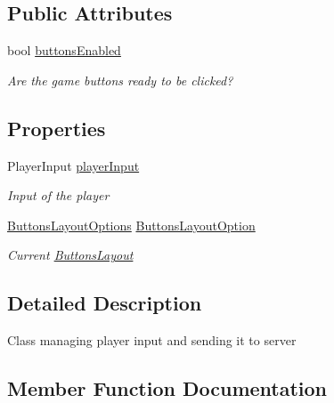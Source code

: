 \subsection*{Public Attributes}
\begin{DoxyCompactItemize}
\item 
bool \mbox{\hyperlink{class_game_pad_1_1_player_ac313e382120a9a078b14699582519e21}{buttons\+Enabled}}
\begin{DoxyCompactList}\small\item\em Are the game buttons ready to be clicked? \end{DoxyCompactList}\end{DoxyCompactItemize}
\subsection*{Properties}
\begin{DoxyCompactItemize}
\item 
Player\+Input \mbox{\hyperlink{class_game_pad_1_1_player_a1a82f9fc7b2d4e62379383f26173b51e}{player\+Input}}
\begin{DoxyCompactList}\small\item\em Input of the player \end{DoxyCompactList}\item 
\mbox{\hyperlink{namespace_game_pad_ad65f651e47321df25402246e8df26c37}{Buttons\+Layout\+Options}} \mbox{\hyperlink{class_game_pad_1_1_player_ac192b98678d2dee17a969ee788d7a1a3}{Buttons\+Layout\+Option}}
\begin{DoxyCompactList}\small\item\em Current \mbox{\hyperlink{class_game_pad_1_1_buttons_layout}{Buttons\+Layout}} \end{DoxyCompactList}\end{DoxyCompactItemize}


\subsection{Detailed Description}
Class managing player input and sending it to server 



\subsection{Member Function Documentation}
\mbox{\label{class_game_pad_1_1_player_ab9a2029ba8cc16a59a4e888fd124737a}} 
